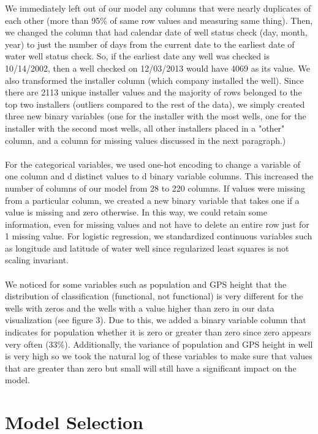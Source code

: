 \documentclass[10pt]{SelfArx} %
\begin{document}
We immediately left out of our model any columns that were nearly duplicates of each other (more than 95\% of same row values and measuring same thing). Then, we changed the column that had calendar date of well status check (day, month, year) to just the number of days from the current date to the earliest date of water well status check. So, if the earliest date any well was checked is 10/14/2002, then a well checked on 12/03/2013 would have 4069 as its value. We also transformed the installer column (which company installed the well). Since there are 2113 unique installer values and the majority of rows belonged to the top two installers (outliers compared to the rest of the data), we simply created three new binary variables (one for the installer with the most wells, one for the installer with the second most wells, all other installers placed in a "other" column, and a column for missing values discussed in the next paragraph.)
\\[-1.5\baselineskip]
\\[0\baselineskip]
\break
For the categorical variables, we used one-hot encoding to change a variable of one column and d distinct values to d binary variable columns. This increased the number of columns of our model from 28 to 220 columns. If values were missing from a particular column, we created a new binary variable that takes one if a value is missing and zero otherwise. In this way, we could retain some information, even for missing values and not have to delete an entire row just for 1 missing value.  For logistic regression, we standardized continuous variables such as longitude and latitude of water well since regularized least squares is not scaling invariant.
\\[-1.5\baselineskip]
\\[0\baselineskip]
\break
We noticed for some variables such as population and GPS height that the distribution of classification (functional, not functional) is very different for the wells with zeros and the wells with a value higher than zero in our data visualization (see figure 3). Due to this, we added a binary variable column that indicates for population whether it is zero or greater than zero since zero appears very often (33\%). Additionally, the variance of population and GPS height in well is very high so we took the natural log of these variables to make sure that values that are greater than zero but small will still have a significant impact on the model.

\section{Model Selection}
\end{document}
